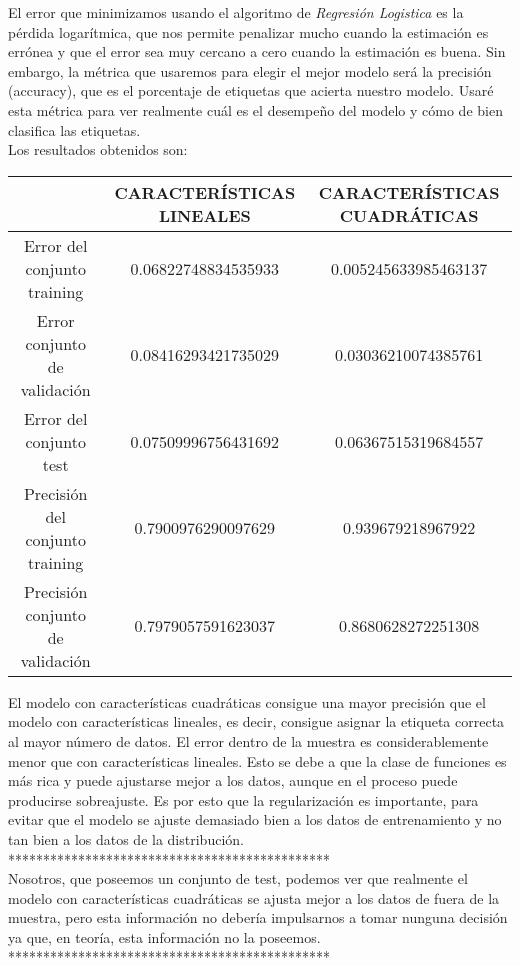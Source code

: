 \documentclass{article}
\begin{document}
El error que minimizamos usando el algoritmo de \textit{Regresión Logistica} es la pérdida logarítmica, que nos permite penalizar mucho cuando la estimación es errónea y que el error sea muy cercano a cero cuando la estimación es buena. Sin embargo, la métrica que usaremos para elegir el mejor modelo será la precisión (accuracy), que es el porcentaje de etiquetas que acierta nuestro modelo. Usaré esta métrica para ver realmente cuál es el desempeño del modelo y cómo de bien clasifica las etiquetas.\\

Los resultados obtenidos son:

\begin{center}
\begin{tabular}{|c|c|c|}
\hline
\multicolumn{1}{|c|}{}& \textbf{CARACTERÍSTICAS LINEALES} &
\textbf{CARACTERÍSTICAS CUADRÁTICAS}  \\ \hline
  Error del conjunto training       & 0.06822748834535933 & 0.005245633985463137 \\
  Error conjunto de validación      & 0.08416293421735029 & 0.03036210074385761 \\
  Error del conjunto test           & 0.07509996756431692 & 0.06367515319684557 \\
  Precisión del conjunto training   & 0.7900976290097629  & 0.939679218967922 \\
  Precisión conjunto de validación  & 0.7979057591623037  & 0.8680628272251308 \\ \hline
\end{tabular}
\end{center}

El modelo con características cuadráticas consigue una mayor precisión que el modelo con características lineales, es decir, consigue asignar la etiqueta correcta al mayor número de datos. El error dentro de la muestra es considerablemente menor que con características lineales. Esto se debe a que la clase de funciones es más rica y puede ajustarse mejor a los datos, aunque en el proceso puede producirse sobreajuste. Es por esto que la regularización es importante, para evitar que el modelo se ajuste demasiado bien a los datos de entrenamiento y no tan bien a los datos de la distribución.\\

                    **********************************************\\
Nosotros, que poseemos un conjunto de test, podemos ver que realmente el modelo con características cuadráticas se ajusta mejor a los datos de fuera de la muestra, pero esta información no debería impulsarnos a tomar nunguna decisión ya que, en teoría, esta información no la poseemos.\\
                    **********************************************\\
\end{document}

